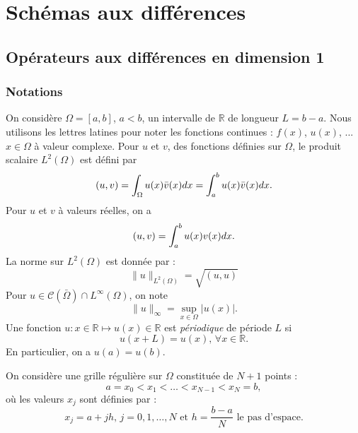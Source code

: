 \chapter{Schémas aux différences}
\label{chap:1}

\section{Opérateurs aux différences en dimension 1}

\subsection{Notations}
\label{sec:notation_1D}

On considère $\Omega = [a,b]$, $a<b$, un intervalle de $\mathbb{R}$ de longueur $L=b-a$. Nous utilisons les lettres latines pour noter les fonctions continues : $f(x)$, $u(x)$, ... $x \in \Omega$ à valeur complexe. Pour $u$ et $v$, des fonctions définies sur $\Omega$, le produit scalaire $L^2 ( \Omega )$ est défini par
\begin{equation}
(u,v) = \displaystyle\int_{\Omega} u(x) \bar{v}(x) dx = \displaystyle\int_{a}^b u(x) \bar{v}(x) dx.
\end{equation}
Pour $u$ et $v$ à valeurs réelles, on a
\begin{equation}
(u,v) = \displaystyle\int_{a}^b u(x) v(x) dx.
\end{equation}
La norme sur $L^2(\Omega)$ est donnée par :
\begin{equation}
\| u \|_{L^2(\Omega)} = \sqrt{(u,u)}
\end{equation}
Pour $u \in \mathcal
C(\bar{\Omega}) \cap L^{\infty}(\Omega)$, on note
\begin{equation}
\| u \|_{\infty} = \sup_{x\in\Omega} |u(x)|.
\end{equation}
Une fonction $u : x \in \mathbb{R} \mapsto u(x) \in \mathbb{R}$ est \textit{périodique} de période $L$ si 
\begin{equation}
u(x+L) = u(x) \text{, } \forall x \in \mathbb{R}.
\end{equation}
En particulier, on a $u(a)=u(b)$.

On considère une grille régulière sur $\Omega$ constituée de $N + 1$ points :
\begin{equation}
a=x_0 < x_1 < \ldots < x_{N-1} < x_N = b,
\end{equation}
où les valeurs $x_j$ sont définies par :
\begin{equation}
x_j = a + j h\text{, } j = 0,1, \ldots,N \text{ et } h = \dfrac{b-a}{N} \text{ le pas d'espace}. 
\end{equation}

